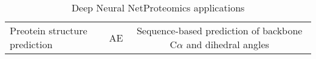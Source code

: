 \begin{table}[h!]
\centering
\begin{tabular}{|l|c|c|}
    \hline
    Preotein structure prediction & AE & Sequence-based prediction of backbone C$\alpha$ and dihedral angles 
    \hline
\end{tabular}
\caption{Deep Neural NetProteomics applications}
\label{tab:PS-DNN}
\end{table}